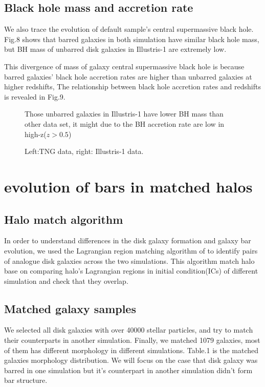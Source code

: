 \subsection{Black hole mass and accretion rate}
We also trace the evolution of default sample's central supermassive black hole. 
Fig.8 shows that barred galaxies in both simulation have similar black hole mass,
but BH mass of unbarred disk galaxies in Illustris-1 are extremely low.

This divergence of mass of galaxy central supermassive black hole is because barred galaxies' black hole accretion rates are higher than unbarred galaxies at higher redshifts, 
The relationship between black hole accretion rates and redshifts is revealed in Fig.9.



\begin{figure*}[h!]
\centering
\begin{center}
\caption{Those unbarred galaxies in Illustris-1 have lower BH mass than other data set, it might due to the BH accretion rate are low in high-z($z > 0.5$)}
\end{center}
\end{figure*}

\begin{figure*}[h!]
\centering
\begin{center}
\caption{Left:TNG data, right: Illustris-1 data. }
\end{center}
\end{figure*}


\section{evolution of bars in matched halos } 
\subsection{Halo match algorithm}
In order to understand differences in the disk galaxy formation and galaxy bar evolution, 
we used the Lagrangian region matching algorithm of \cite{Lovell et al. (2014).} to identify pairs of analogue disk galaxies across the two simulations.
This algorithm match halo base on comparing halo's Lagrangian regions in initial condition(ICs) of different simulation and check that they overlap.

\subsection{Matched galaxy samples}
We selected all disk galaxies with over 40000 stellar particles, and try to match their counterparts in another simulation. 
Finally, we matched 1079 galaxies, most of them has different morphology in different simulations.
Table.1 is the matched galaxies morphology distribution.
We will focus on the case that disk galaxy was barred in one simulation but it's counterpart in another simulation didn't form bar structure.

